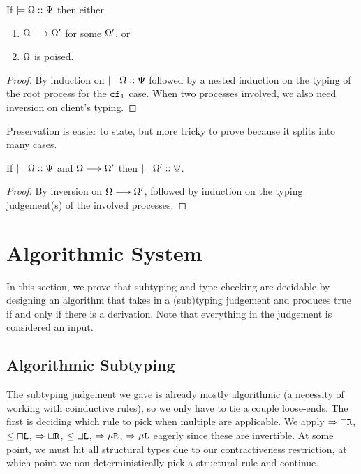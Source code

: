 \documentclass[a4paper,USenglish]{lipics-v2016}
\begin{document}
\begin{theorem}[Progress]
If $\models {\Omega} :: {\Psi}$ then either
\begin{enumerate}
  \item $\Omega \longrightarrow \Omega'$ for some $\Omega'$, or
  \item $\Omega$ is poised.
\end{enumerate}
\end{theorem}
\begin{proof}
  By induction on $\models {\Omega} :: {\Psi}$ followed by a nested induction on the typing of the root process for the $\texttt{cf}_1$ case. When two processes involved, we also need inversion on client's typing.
\end{proof}


Preservation is easier to state, but more tricky to prove because it splits into many cases.
\begin{theorem}[Preservation]
If $\models {\Omega} :: {\Psi}$ and $\Omega \longrightarrow \Omega'$ then $\models {\Omega'} :: {\Psi}$.
\end{theorem}
\begin{proof}
  By inversion on $\Omega \longrightarrow \Omega'$, followed by induction on the typing judgement(s) of the involved processes.
\end{proof}


\section{Algorithmic System}
\label{algorithmic}

In this section, we prove that subtyping and type-checking are decidable by designing an algorithm that takes in a (sub)typing judgement and produces true if and only if there is a derivation. Note that everything in the judgement is considered an input.


\subsection{Algorithmic Subtyping}

The subtyping judgement we gave is already mostly algorithmic (a necessity of working with coinductive rules), so we only have to tie a couple loose-ends. The first is deciding which rule to pick when multiple are applicable. We apply $\Rightarrow{\mathbin{\sqcap}\texttt{R}}$, $\le{\mathbin{\sqcap}\texttt{L}}$, $\Rightarrow{\mathbin{\sqcup}\texttt{R}}$, $\le{\mathbin{\sqcup}\texttt{L}}$, $\Rightarrow{\mu\texttt{R}}$, $\Rightarrow{\mu\texttt{L}}$ eagerly since these are invertible. At some point, we must hit all structural types due to our contractiveness restriction, at which point we non-deterministically pick a structural rule and continue.
\end{document}
